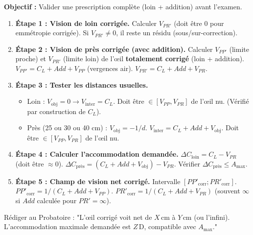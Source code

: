 \documentclass[11pt]{article}
\newcommand{\cle}[1]{{\popxbold\color{popdark}#1}}
\begin{document}
\begin{methode}
\textbf{Objectif :} Valider une prescription complète (loin + addition) avant l'examen.
\begin{enumerate}
    \item \textbf{Étape 1 : Vision de loin corrigée.}
    Calculer $V_{PR'}$ (doit être $0$ pour emmétropie corrigée). Si $V_{PR'} \neq 0$, il reste un résidu (sous/sur-correction).
    \item \textbf{Étape 2 : Vision de près corrigée (avec addition).}
    Calculer $V_{PP'}$ (limite proche) et $V_{PR'}$ (limite loin) de l'œil \textbf{totalement corrigé} (loin + addition).
    $V_{PP'} = C_L + Add + V_{PP}$ (vergences air).
    $V_{PR'} = C_L + Add + V_{PR}$.
    \item \textbf{Étape 3 : Tester les distances usuelles.}
    \begin{itemize}
        \item Loin : $V_{\text{obj}}=0 \to V_{\text{inter}} = C_L$. Doit être $\in [V_{PP}, V_{PR}]$ de l'œil nu. (Vérifié par construction de $C_L$).
        \item Près (25 ou 30 ou 40 cm) : $V_{\text{obj}} = -1/d$. $V_{\text{inter}} = C_L + Add + V_{\text{obj}}$.
        Doit être $\in [V_{PP}, V_{PR}]$ de l'œil nu.
    \end{itemize}
    \item \textbf{Étape 4 : Calculer l'accommodation demandée.}
    $\Delta C_{\text{loin}} = C_L - V_{PR}$ (doit être $\approx 0$).
    $\Delta C_{\text{près}} = (C_L + Add + V_{\text{obj}}) - V_{PR}$.
    Vérifier $\Delta C_{\text{près}} \le A_{\text{max}}$.
    \item \textbf{Étape 5 : Champ de vision net corrigé.}
    Intervalle $[PP'_{\text{corr}} ; PR'_{\text{corr}}]$.
    $PP'_{\text{corr}} = 1 / (C_L + Add + V_{PP})$.
    $PR'_{\text{corr}} = 1 / (C_L + Add + V_{PR})$ (souvent $\infty$ si $Add$ calculée pour $PR'=\infty$).
\end{enumerate}
\cle{Rédiger au Probatoire :} "L'œil corrigé voit net de $X\,\text{cm}$ à $Y\,\text{cm}$ (ou l'infini). L'accommodation maximale demandée est $Z\,\text{D}$, compatible avec $A_{\text{max}}$."
\end{methode}
\end{document}
